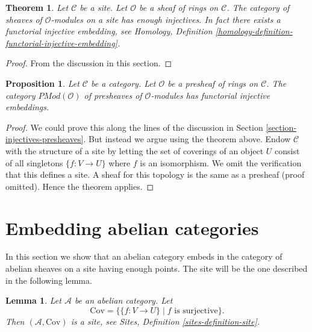 \documentclass{stacks-project}
\theoremstyle{plain}
\newtheorem{theorem}[subsection]{Theorem}
\newtheorem{proposition}[subsection]{Proposition}
\newtheorem{lemma}[subsection]{Lemma}
\theoremstyle{definition}
\theoremstyle{remark}
\numberwithin{equation}{subsection}
\begin{document}
\begin{theorem}
\label{theorem-sheaves-modules-injectives}
Let $\mathcal{C}$ be a site.
Let $\mathcal{O}$ be a sheaf of rings on $\mathcal{C}$.
The category of sheaves of $\mathcal{O}$-modules on a
site has enough injectives. In fact there exists
a functorial injective embedding, see
Homology, Definition \ref{homology-definition-functorial-injective-embedding}.
\end{theorem}

\begin{proof}
From the discussion in this section.
\end{proof}

\begin{proposition}
\label{proposition-presheaves-modules}
Let $\mathcal{C}$ be a category.
Let $\mathcal{O}$ be a presheaf of rings on $\mathcal{C}$.
The category $\textit{PMod}(\mathcal{O})$ of presheaves of
$\mathcal{O}$-modules has functorial injective embeddings.
\end{proposition}

\begin{proof}
We could prove this along the lines of the discussion in
Section \ref{section-injectives-presheaves}. But instead we argue using the
theorem above. Endow $\mathcal{C}$ with the structure of a site by letting the
set of coverings of an object $U$ consist of all singletons $\{f : V \to U\}$
where $f$ is an isomorphism. We omit the verification that this defines a site.
A sheaf for this topology is the same as a presheaf (proof omitted). Hence the
theorem applies.
\end{proof}








\section{Embedding abelian categories}
\label{section-embedding}

\noindent
In this section we show that an abelian category embeds in the
category of abelian sheaves on a site having enough points.
The site will be the one described in the following lemma.

\begin{lemma}
\label{lemma-site-abelian-category}
Let $\mathcal{A}$ be an abelian category.
Let
$$
\text{Cov} = \{\{f : V \to U\} \mid f\text{ is surjective}\}.
$$
Then $(\mathcal{A}, \text{Cov})$ is a site, see
Sites, Definition \ref{sites-definition-site}.
\end{lemma}
\end{document}
